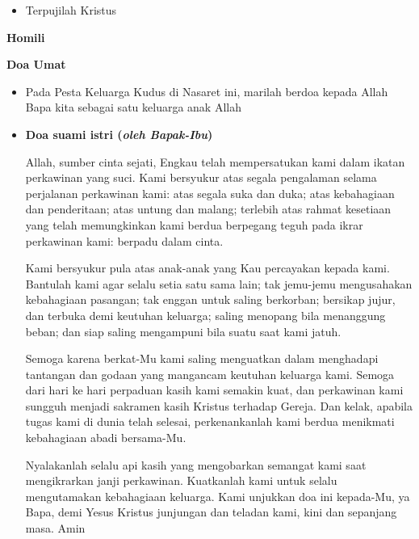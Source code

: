 \documentclass[a5paper,12pt,openany]{scrbook}
\makeatletter
\newcommand{\subjudul}[1]{%
  {\parindent \z@ \normalfont
    \interlinepenalty\@M \bfseries #1\par\nobreak \vskip 20\p@ }}
\newcommand{\BU}[1]{\begin{itemize} \item[U:] #1 \end{itemize}}
\newcommand{\BP}[1]{\begin{itemize} \item[P:] #1 \end{itemize}}
\makeatother
\begin{document}
\BU{Terpujilah Kristus}

\subjudul{Homili}


\subjudul{Doa Umat}

\BP{Pada Pesta Keluarga Kudus di Nasaret ini, marilah berdoa kepada Allah Bapa kita sebagai satu keluarga anak Allah}

\BP{\textbf{Doa suami istri (\textit{oleh Bapak-Ibu})}

Allah, sumber cinta sejati, Engkau telah mempersatukan kami dalam ikatan perkawinan yang suci. Kami bersyukur atas segala pengalaman selama perjalanan perkawinan kami: atas segala suka dan duka; atas kebahagiaan dan penderitaan; atas untung dan malang; terlebih atas rahmat kesetiaan yang telah memungkinkan kami berdua berpegang teguh pada ikrar perkawinan kami: berpadu dalam cinta.

Kami bersyukur pula atas anak-anak yang Kau percayakan kepada kami. Bantulah kami agar selalu setia satu sama lain; tak jemu-jemu mengusahakan kebahagiaan pasangan; tak enggan untuk saling berkorban; bersikap jujur, dan terbuka demi keutuhan keluarga; saling menopang bila menanggung beban; dan siap saling mengampuni bila suatu saat kami jatuh.

Semoga karena berkat-Mu kami saling menguatkan dalam menghadapi tantangan dan godaan yang mangancam keutuhan keluarga kami. Semoga dari hari ke hari perpaduan kasih kami semakin kuat, dan perkawinan kami sungguh menjadi sakramen kasih Kristus terhadap Gereja. Dan kelak, apabila tugas kami di dunia telah selesai, perkenankanlah kami berdua menikmati kebahagiaan abadi bersama-Mu.

Nyalakanlah selalu api kasih yang mengobarkan semangat kami saat mengikrarkan janji perkawinan. Kuatkanlah kami untuk selalu mengutamakan kebahagiaan keluarga.
Kami unjukkan doa ini kepada-Mu, ya Bapa, demi Yesus Kristus junjungan dan teladan kami, kini dan sepanjang masa. Amin}
\end{document}
